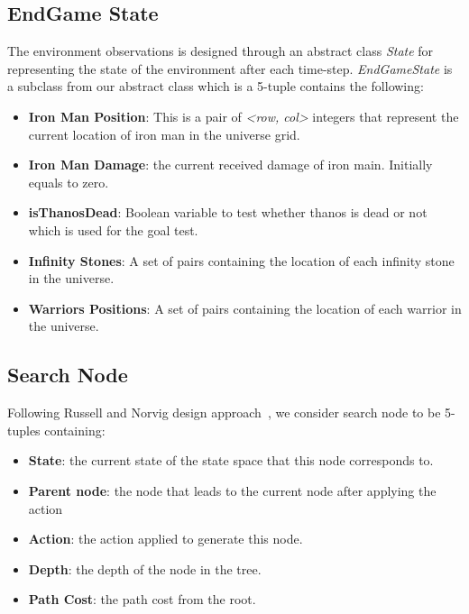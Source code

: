 \documentclass{article}
\begin{document}
\subsection{EndGame State}
The environment observations is designed through an abstract class \textit{State} for representing the state of the environment after each time-step. \textit{EndGameState} is a subclass from our abstract class which is a 5-tuple contains the following:
\begin{itemize}
  \item \textbf{Iron Man Position}: This is a pair of \textit{<row, col>} integers that represent the current location of iron man in the universe grid.
	\item \textbf{Iron Man Damage}: the current received damage of iron main. Initially equals to zero.
	\item \textbf{isThanosDead}: Boolean variable to test whether thanos is dead or not which is used for the goal test.
	\item \textbf{Infinity Stones}: A set of pairs containing the location of each infinity stone in the universe.
	\item \textbf{Warriors Positions}: A set of pairs containing the location of each warrior in the universe.
\end{itemize}

\subsection{Search Node}
Following Russell and Norvig design approach~\cite{russell2016artificial}, we consider search node to be 5-tuples containing:
\begin{itemize}
  \item \textbf{State}: the current state of the state space that this node corresponds to.
  \item \textbf{Parent node}: the node that leads to the current node after applying the action
  \item \textbf{Action}: the action applied to generate this node.
  \item \textbf{Depth}: the depth of the node in the tree.
  \item \textbf{Path Cost}: the path cost from the root.  
\end{itemize}
\end{document}
